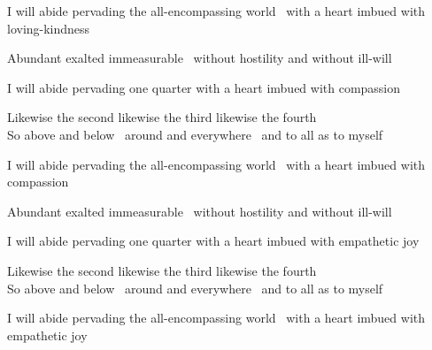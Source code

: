 \begin{english-hang}
  I will abide pervading the all-encompassing world \breathmark\ with a heart imbued with loving-kindness
\end{english-hang}

\begin{english-hang}
  Abundant exalted immeasurable \breathmark\ without hostility and without ill-will
\end{english-hang}

\medskip

\begin{english-hang}
  I will abide pervading one quarter with a heart imbued with compassion
\end{english-hang}

\begin{english}
  Likewise the second likewise the third likewise the fourth\\
  So above and below \breathmark\ around and everywhere \breathmark\ and to all as to myself
\end{english}

\begin{english-hang}
  I will abide pervading the all-encompassing world \breathmark\ with a heart imbued with compassion
\end{english-hang}

\begin{english-hang}
  Abundant exalted immeasurable \breathmark\ without hostility and without ill-will
\end{english-hang}

\medskip

\begin{english-hang}
  I will abide pervading one quarter with a heart imbued with empathetic joy\makeatletter\hyperlink{endnote97-appendix}\makeatother
\end{english-hang}

\begin{english}
  Likewise the second likewise the third likewise the fourth\\
  So above and below \breathmark\ around and everywhere \breathmark\ and to all as to myself
\end{english}

\begin{english-hang}
  I will abide pervading the all-encompassing world \breathmark\ with a heart imbued with empathetic joy
\end{english-hang}

